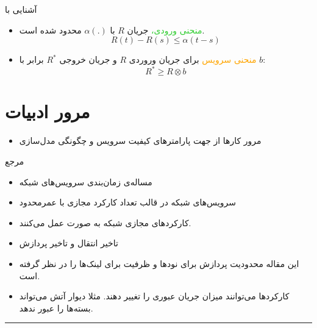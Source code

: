\documentclass[dvipsnames]{beamer}
\makeatletter
\newcommand{\RTList}{\raggedleft\rightskip\@totalleftmargin}
\makeatother
\begin{document}
\begin{persian}
	\begin{frame}{آشنایی با }
		\begin{itemize}\RTList{}
			\justifying%
		  \item \textcolor{LimeGreen}{منحنی ورودی،}
				جریان \(R\) با \( \alpha(.) \) محدود شده است.
			\[ R(t) - R(s) \le \alpha(t - s) \]
		  \item \textcolor{Orange}{منحنی سرویس}
				برای جریان وروردی \(R\) و جریان خروجی \(R^{*}\) برابر با \(b\):
			\[ R^{*} \ge R \otimes b \]
		\end{itemize}
	\end{frame}

	\section{مرور ادبیات}

	\begin{frame}{}
	  \begin{itemize}
			  \item مرور کارها از جهت پارامترهای کیفیت سرویس و چگونگی مدل‌سازی
	  \end{itemize}
	\end{frame}


	\begin{frame}{مرجع~\cite{Qu2016}}
		\begin{itemize}\RTList{}
			\justifying%
			\item مساله‌ی زمان‌بندی سرویس‌های شبکه
			\item سرویس‌های شبکه در قالب تعداد کارکرد مجازی با عمرمحدود
			\item کارکردهای مجازی شبکه به صورت  عمل می‌کنند.
			\item تاخیر انتقال و تاخیر پردازش
			\item این مقاله محدودیت پردازش برای نودها و ظرفیت برای لینک‌ها را در نظر گرفته است.
			\item کارکردها می‌توانند میزان جریان عبوری را تغییر دهند. مثلا دیوار آتش می‌تواند بسته‌ها را عبور ندهد.
		\end{itemize}
		\begin{latin}
		\noindent\rule{1cm}{0.4pt}\\
		\scriptsize{}
		\end{latin}
	\end{frame}


\end{persian}
\end{document}
